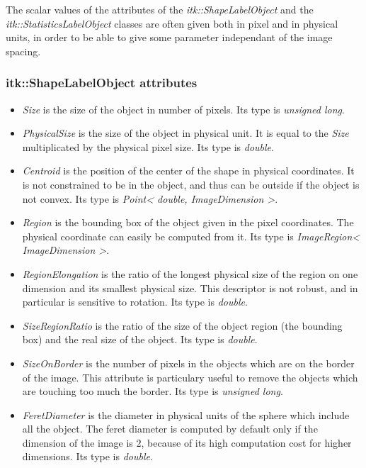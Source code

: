 \documentclass{InsightArticle}
\begin{document}
The scalar values of the attributes of the {\em itk::ShapeLabelObject} and the
{\em itk::StatisticsLabelObject} classes are often given both in pixel and in physical units,
in order to be able to give some parameter independant of the image spacing.

\subsubsection{itk::ShapeLabelObject attributes}

\begin{itemize}
  \item {\em Size} is the size of the object in number of pixels. Its type is
{\em unsigned long}.
  \item {\em PhysicalSize} is the size of the object in physical unit. It is equal
to the {\em Size} multiplicated by the physical pixel size. Its type is {\em double}.
  \item {\em Centroid} is the position of the center of the shape in physical coordinates. It is not
constrained to be in the object, and thus can be outside if the object is not convex.
Its type is {\em Point< double, ImageDimension >}. 
  \item {\em Region} is the bounding box of the object given in the pixel coordinates.
The physical coordinate can easily be computed from it. Its type is
{\em ImageRegion< ImageDimension >}.
  \item {\em RegionElongation} is the ratio of the longest physical size of the region
on one dimension and its smallest physical size. This descriptor is not robust, and in
particular is sensitive to rotation. Its type is {\em double}.
  \item {\em SizeRegionRatio} is the ratio of the size of the object region (the
bounding box) and the real size of the object. Its type is {\em double}.
  \item {\em SizeOnBorder} is the number of pixels in the objects which are on the border
of the image. This attribute is particulary useful to remove the objects which are touching
too much the border. Its type is {\em unsigned long}.
  \item {\em FeretDiameter} is the diameter in physical units of the sphere which include
all the object. The feret diameter is computed by default only if the dimension of the image
is $2$, because of its high computation cost for higher dimensions. Its type is {\em double}.
\end{itemize}
\end{document}
